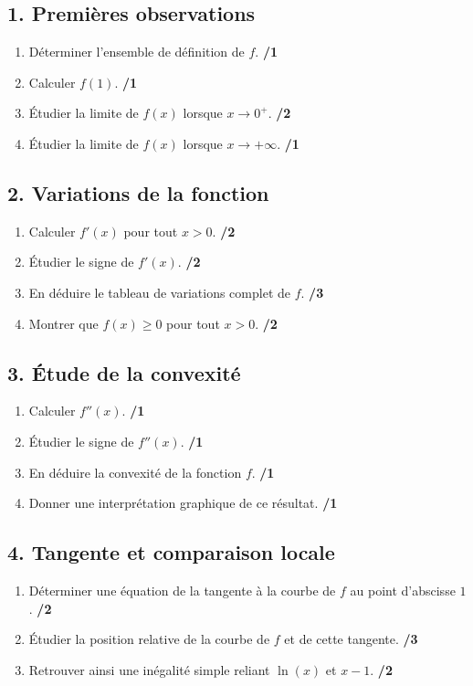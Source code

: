 \documentclass[11pt,a4paper]{article}
\begin{document}
\subsection*{1. Premières observations}
\begin{enumerate}
    \item Déterminer l'ensemble de définition de \(f\). \hfill \textbf{/1}
    \item Calculer \(f(1)\). \hfill \textbf{/1}
    \item Étudier la limite de \(f(x)\) lorsque \(x\to 0^+\). \hfill \textbf{/2}
    \item Étudier la limite de \(f(x)\) lorsque \(x\to +\infty\). \hfill \textbf{/1}
\end{enumerate}

\subsection*{2. Variations de la fonction}
\begin{enumerate}
    \item Calculer \(f'(x)\) pour tout \(x>0\). \hfill \textbf{/2}
    \item Étudier le signe de \(f'(x)\). \hfill \textbf{/2}
    \item En déduire le tableau de variations complet de \(f\). \hfill \textbf{/3}
    \item Montrer que \(f(x)\geq 0\) pour tout \(x>0\). \hfill \textbf{/2}
\end{enumerate}

\subsection*{3. Étude de la convexité}
\begin{enumerate}
    \item Calculer \(f''(x)\). \hfill \textbf{/1}
    \item Étudier le signe de \(f''(x)\). \hfill \textbf{/1}
    \item En déduire la convexité de la fonction \(f\). \hfill \textbf{/1}
    \item Donner une interprétation graphique de ce résultat. \hfill \textbf{/1}
\end{enumerate}

\subsection*{4. Tangente et comparaison locale}
\begin{enumerate}
    \item Déterminer une équation de la tangente à la courbe de \(f\) au point d'abscisse \(1\). \hfill \textbf{/2}
    \item Étudier la position relative de la courbe de \(f\) et de cette tangente. \hfill \textbf{/3}
    \item Retrouver ainsi une inégalité simple reliant \(\ln(x)\) et \(x-1\). \hfill \textbf{/2}
\end{enumerate}
\end{document}
